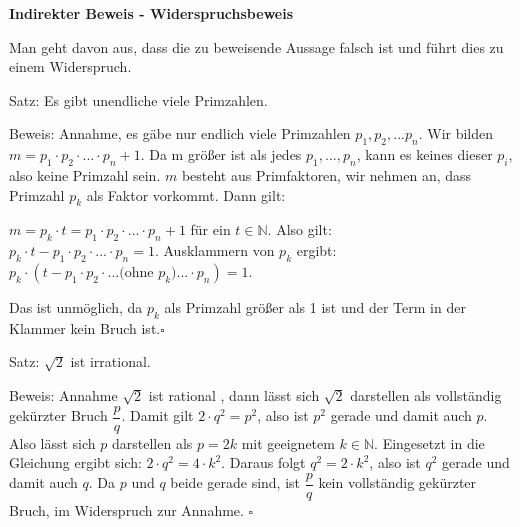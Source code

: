 \begin{frame}[fragile]

\textbf{Indirekter Beweis - Widerspruchsbeweis}

Man geht davon aus, dass die zu beweisende Aussage falsch ist und führt dies zu einem Widerspruch. \pause

Satz: Es gibt unendliche viele Primzahlen. \pause

Beweis: Annahme, es gäbe nur endlich viele Primzahlen \pause $p_1, p_2, ... p_n$. \pause Wir bilden 
$m = p_1 \cdot p_2 \cdot ... \cdot p_n + 1$. \pause Da m größer ist als jedes $p_1,...,p_n$, kann es keines dieser $p_i$, also keine Primzahl sein. \pause $m$ besteht aus Primfaktoren, wir nehmen an, dass Primzahl $p_k$ als Faktor vorkommt. \pause Dann gilt:

\quad $m = p_k \cdot t =  p_1 \cdot p_2 \cdot ... \cdot p_n + 1$ für ein $t \in \mathbb{N}$. \pause Also gilt: \\
\quad $p_k \cdot t - p_1 \cdot p_2 \cdot ... \cdot p_n = 1$. \pause Ausklammern von $p_k$ ergibt: \\  
\quad $p_k \cdot ( t - p_1 \cdot p_2 \cdot ... \text{(ohne $p_k$)} ...\cdot p_n) = 1$. \pause

Das ist unmöglich, da $p_k$ als Primzahl größer als 1 ist und der Term in der Klammer kein Bruch ist.\hfill $\square$

\end{frame}

\begin{frame}[fragile]

Satz: $\sqrt{2}$ ist irrational.  \pause

Beweis: Annahme  $\sqrt{2}$ ist rational \pause, dann lässt sich $\sqrt{2}$ darstellen als vollständig gekürzter 
Bruch $ \dfrac{p}{q}$. \pause Damit gilt $2 \cdot q^2 = p^2$\pause, also ist $p^2$ gerade und damit auch $p$. \pause Also
lässt sich $p$ darstellen als $p = 2k$ mit geeignetem $k \in \mathbb{N}$.  \pause Eingesetzt in die Gleichung ergibt sich: $2 \cdot q^2 = 4 \cdot k^2$. \pause Daraus folgt  $q^2 = 2 \cdot k^2$\pause, also ist $q^2$ gerade und damit auch $q$. \pause Da $p$ und $q$ beide gerade sind, ist  $ \dfrac{p}{q}$ kein vollständig gekürzter Bruch\pause, im Widerspruch zur Annahme. \hfill $\square$
 

\end{frame}

